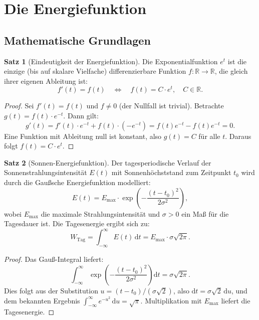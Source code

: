 ﻿\documentclass[a4paper,12pt]{article}
\theoremstyle{definition}
\newtheorem{satz}{Satz}
\begin{document}
\section{Die Energiefunktion}
\label{sec:efunktion}

\subsection{Mathematische Grundlagen}

\begin{satz}[Eindeutigkeit der Energiefunktion]
\label{satz:eindeutigkeit}
    Die Exponentialfunktion $e^t$ ist die einzige (bis auf skalare Vielfache)
    differenzierbare Funktion $f : \mathbb{R} \to \mathbb{R}$, die gleich ihrer
    eigenen Ableitung ist:
    \[
        f'(t) = f(t) \quad \Longleftrightarrow \quad f(t) = C \cdot e^t, \quad C \in \mathbb{R}.
    \]
\end{satz}

\begin{proof}
    Sei $f'(t) = f(t)$ und $f \neq 0$ (der Nullfall ist trivial). Betrachte
    $g(t) = f(t) \cdot e^{-t}$. Dann gilt:
    \[
        g'(t) = f'(t) \cdot e^{-t} + f(t) \cdot (-e^{-t}) = f(t) e^{-t} - f(t) e^{-t} = 0.
    \]
    Eine Funktion mit Ableitung null ist konstant, also $g(t) = C$ f\"ur alle $t$.
    Daraus folgt $f(t) = C \cdot e^t$. \qedhere
\end{proof}

\begin{satz}[Sonnen-Energiefunktion]
\label{satz:sonne}
    Der tagesperiodische Verlauf der Sonnenstrahlungsintensit\"at $E(t)$ mit
    Sonnenhöchststand zum Zeitpunkt $t_0$ wird durch die Gau\ss{}sche Energiefunktion
    modelliert:
    \[
        E(t) = E_{\max} \cdot \exp\!\left(-\frac{(t - t_0)^2}{2\sigma^2}\right),
    \]
    wobei $E_{\max}$ die maximale Strahlungsintensit\"at und $\sigma > 0$ ein
    Ma\ss{} f\"ur die Tagesdauer ist. Die Tagesenergie ergibt sich zu:
    \[
        W_{\mathrm{Tag}} = \int_{-\infty}^{\infty} E(t)\,\mathrm{d}t
        = E_{\max} \cdot \sigma \sqrt{2\pi}.
    \]
\end{satz}

\begin{proof}
    Das Gau\ss{}-Integral liefert:
    \[
        \int_{-\infty}^{\infty} \exp\!\left(-\frac{(t-t_0)^2}{2\sigma^2}\right) \mathrm{d}t
        = \sigma \sqrt{2\pi}.
    \]
    Dies folgt aus der Substitution $u = (t-t_0)/(\sigma\sqrt{2})$, also
    $\mathrm{d}t = \sigma\sqrt{2}\,\mathrm{d}u$, und dem bekannten Ergebnis
    $\int_{-\infty}^{\infty} e^{-u^2}\,\mathrm{d}u = \sqrt{\pi}$. Multiplikation
    mit $E_{\max}$ liefert die Tagesenergie. \qedhere
\end{proof}
\end{document}
